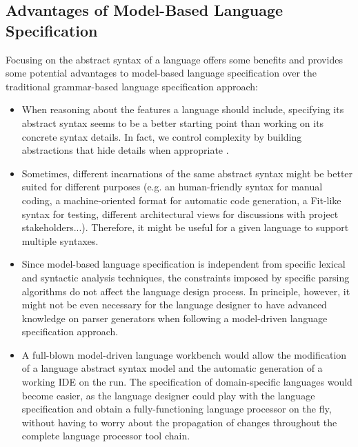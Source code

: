 \documentclass[preprint]{elsarticle}
\begin{document}
\subsection{Advantages of Model-Based Language Specification} \label{subsec:modelbased}

Focusing on the abstract syntax of a language offers some benefits \cite{Kleppe2007} and provides some potential advantages to model-based language specification over the traditional grammar-based language specification approach:

\begin{itemize}

\item
When reasoning about the features a language should include, specifying its abstract syntax seems to be a better starting point than working on its concrete syntax details.
In fact, we control complexity by building abstractions that hide details when appropriate \cite{sicp}.

\item
Sometimes, different incarnations of the same abstract syntax might be better suited for different purposes (e.g. an human-friendly syntax for manual coding, a machine-oriented format for automatic code generation, a Fit-like \cite{fit} syntax for testing, different architectural views for discussions with project stakeholders...).
Therefore, it might be useful for a given language to support multiple syntaxes.

\item
Since model-based language specification is independent from specific lexical and syntactic analysis techniques, the constraints imposed by specific parsing algorithms do not affect the language design process.
In principle, however, it might not be even necessary for the language designer to have advanced knowledge on parser generators when following a model-driven language specification approach.

\item
A full-blown model-driven language workbench \cite{language-workbenches,Reiss1985,Borras1988,Hedin1988,Bjarnason1996,Grundy2013} would allow the modification of a language abstract syntax model and the automatic generation of a working IDE on the run.
The specification of domain-specific languages would become easier, as the language designer could play with the language specification and obtain a fully-functioning language processor on the fly, without having to worry about the propagation of changes throughout the complete language processor tool chain.
\end{itemize}
\end{document}
